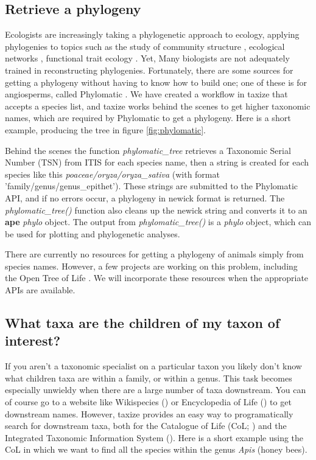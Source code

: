 \documentclass[10pt]{article}\usepackage{graphicx, color}
\begin{document}
\subsection*{Retrieve a phylogeny}
Ecologists are increasingly taking a phylogenetic approach to ecology, applying phylogenies to topics such as the study of community structure \cite{webb2002phylogenies}, ecological networks \cite{rafferty2013phylogenetic}, functional trait ecology \cite{REF}. Yet, Many biologists are not adequately trained in reconstructing phylogenies. Fortunately, there are some sources for getting a phylogeny without having to know how to build one; one of these is for angiosperms, called Phylomatic \cite{webb2005}. We have created a workflow in taxize that accepts a species list, and taxize works behind the scenes to get higher taxonomic names, which are required by Phylomatic to get a phylogeny. Here is a short example, producing the tree in figure \ref{fig:phylomatic}.

Behind the scenes the function \emph{phylomatic\_tree} retrieves a Taxonomic Serial Number (TSN) from ITIS for each species name, then a string is created for each species like this \emph{poaceae/oryza/oryza\_sativa} (with format 'family/genus/genus\_epithet'). These strings are submitted to the Phylomatic API, and if no errors occur, a phylogeny in newick format is returned. The \emph{phylomatic\_tree()} function also cleans up the newick string and converts it to an \textbf{ape} \emph{phylo} object. The output from \emph{phylomatic\_tree()} is a \emph{phylo} object, which can be used for plotting and phylogenetic analyses. 

There are currently no resources for getting a phylogeny of animals simply from species names. However, a few projects are working on this problem, including the Open Tree of Life \cite{opentree}. We will incorporate these resources when the appropriate APIs are available.


\subsection*{What taxa are the children of my taxon of interest?}
If you aren't a taxonomic specialist on a particular taxon you likely don't know what children taxa are within a family, or within a genus. This task becomes especially unwieldy when there are a large number of taxa downstream. You can of course go to a website like Wikispecies (\cite{wikispecies}) or Encyclopedia of Life (\cite{eol}) to get downstream names. However, taxize provides an easy way to programatically search for downstream taxa, both for the Catalogue of Life (CoL; \cite{col}) and the Integrated Taxonomic Information System (\cite{itis}). Here is a short example using the CoL in which we want to find all the species within the genus \emph{Apis} (honey bees).
\end{document}
